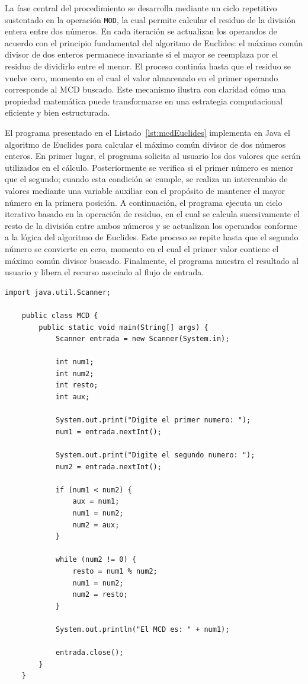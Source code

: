 \documentclass[12pt,twoside]{book}
\begin{document}
					La fase central del procedimiento se desarrolla mediante un ciclo repetitivo sustentado en la operación \texttt{MOD}, la cual permite calcular el residuo de la división entera entre dos números. En cada iteración se actualizan los operandos de acuerdo con el principio fundamental del algoritmo de Euclides: el máximo común divisor de dos enteros permanece invariante si el mayor se reemplaza por el residuo de dividirlo entre el menor. El proceso continúa hasta que el residuo se vuelve cero, momento en el cual el valor almacenado en el primer operando corresponde al MCD buscado. Este mecanismo ilustra con claridad cómo una propiedad matemática puede transformarse en una estrategia computacional eficiente y bien estructurada.
					
					El programa presentado en el Listado~\ref{lst:mcdEuclides} implementa en Java el algoritmo de Euclides para calcular el máximo común divisor de dos números enteros. En primer lugar, el programa solicita al usuario los dos valores que serán utilizados en el cálculo. Posteriormente se verifica si el primer número es menor que el segundo; cuando esta condición se cumple, se realiza un intercambio de valores mediante una variable auxiliar con el propósito de mantener el mayor número en la primera posición. A continuación, el programa ejecuta un ciclo iterativo basado en la operación de residuo, en el cual se calcula sucesivamente el resto de la división entre ambos números y se actualizan los operandos conforme a la lógica del algoritmo de Euclides. Este proceso se repite hasta que el segundo número se convierte en cero, momento en el cual el primer valor contiene el máximo común divisor buscado. Finalmente, el programa muestra el resultado al usuario y libera el recurso asociado al flujo de entrada.
					
					\begin{lstlisting}[style=Java,caption={Cálculo del máximo común divisor mediante el algoritmo de Euclides},label={lst:mcdEuclides}]
	import java.util.Scanner;
	
	public class MCD {
		public static void main(String[] args) {
			Scanner entrada = new Scanner(System.in);
			
			int num1;
			int num2;
			int resto;
			int aux;
			
			System.out.print("Digite el primer numero: ");
			num1 = entrada.nextInt();
			
			System.out.print("Digite el segundo numero: ");
			num2 = entrada.nextInt();
			
			if (num1 < num2) {
				aux = num1;
				num1 = num2;
				num2 = aux;
			}
			
			while (num2 != 0) {
				resto = num1 % num2;
				num1 = num2;
				num2 = resto;
			}
			
			System.out.println("El MCD es: " + num1);
			
			entrada.close();
		}
	} \end{lstlisting}
					
\end{document}
